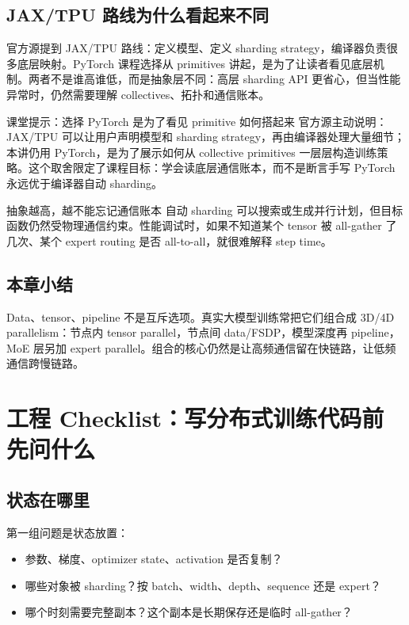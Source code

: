 \documentclass[a4paper]{article}
\begin{document}
\subsection{JAX/TPU 路线为什么看起来不同}

官方源提到 JAX/TPU 路线：定义模型、定义 sharding strategy，编译器负责很多底层映射。PyTorch 课程选择从 primitives 讲起，是为了让读者看见底层机制。两者不是谁高谁低，而是抽象层不同：高层 sharding API 更省心，但当性能异常时，仍然需要理解 collectives、拓扑和通信账本。

\begin{knowledgebox}{课堂提示：选择 PyTorch 是为了看见 primitive 如何搭起来}
官方源主动说明：JAX/TPU 可以让用户声明模型和 sharding strategy，再由编译器处理大量细节；本讲仍用 PyTorch，是为了展示如何从 collective primitives 一层层构造训练策略。这个取舍限定了课程目标：学会读底层通信账本，而不是断言手写 PyTorch 永远优于编译器自动 sharding。
\end{knowledgebox}

\begin{warningbox}{抽象越高，越不能忘记通信账本}
自动 sharding 可以搜索或生成并行计划，但目标函数仍然受物理通信约束。性能调试时，如果不知道某个 tensor 被 all-gather 了几次、某个 expert routing 是否 all-to-all，就很难解释 step time。
\end{warningbox}

\subsection{本章小结}

Data、tensor、pipeline 不是互斥选项。真实大模型训练常把它们组合成 3D/4D parallelism：节点内 tensor parallel，节点间 data/FSDP，模型深度再 pipeline，MoE 层另加 expert parallel。组合的核心仍然是让高频通信留在快链路，让低频通信跨慢链路。

\section{工程 Checklist：写分布式训练代码前先问什么}

\subsection{状态在哪里}

第一组问题是状态放置：

\begin{itemize}
    \item 参数、梯度、optimizer state、activation 是否复制？
    \item 哪些对象被 sharding？按 batch、width、depth、sequence 还是 expert？
    \item 哪个时刻需要完整副本？这个副本是长期保存还是临时 all-gather？
\end{itemize}
\end{document}

